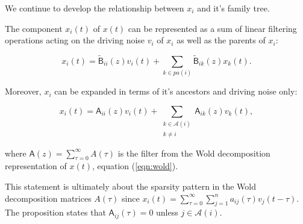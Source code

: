 \documentclass[12pt]{article}
\def\B{\mathsf{B}}  %
\def\wtB{\widetilde{\B}}  %
\def\A{\mathsf{A}}  %
\newcommand{\pa}[1]{pa(#1)}  %
\newcommand{\anc}[1]{\mathcal{A}(#1)}  %
\newcommand{\ancn}[2]{\mathcal{A}_{#1}(#2)}  %
\newcommand{\gpn}[2]{gp_{#1}(#2)}  %
\begin{document}
We continue to develop the relationship between $x_i$ and it's family tree.

\begin{proposition}
  \label{prop:parent_expanding}
  The component $x_i(t)$ of $x(t)$ can be represented as a sum of
  linear filtering operations acting on the driving noise $v_i$ of
  $x_i$ as well as the parents of $x_i$:

  \begin{equation}
    x_i(t) = \wtB_{ii}(z)v_i(t) + \sum_{k \in \pa{i}}\wtB_{ik}(z)x_k(t).
  \end{equation}

  Moreover, $x_i$ can be expanded in terms of it's ancestors and
  driving noise only:

  \begin{equation}
    \label{eqn:ancestor_expansion}
    x_i(t) = \A_{ii}(z)v_i(t) + \sum_{\substack{k \in \anc{i} \\ k \ne i}}\A_{ik}(z)v_k(t),
  \end{equation}

  where $\A(z) = \sum_{\tau = 0}^\infty A(\tau)$ is the filter from
  the Wold decomposition representation of $x(t)$, equation
  (\ref{eqn:wold}).
\end{proposition}

This statement is ultimately about the sparsity pattern in the Wold
decomposition matrices $A(\tau)$ since
$x_i(t) = \sum_{\tau = 0}^\infty \sum_{j = 1}^n a_{ij}(\tau)v_j(t -
\tau)$.  The proposition states that $\A_{ij}(\tau) = 0$ unless
$j \in \anc{i}$.



\end{document}
